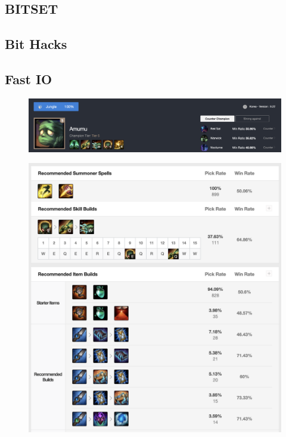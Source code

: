 \documentclass[10pt,landscape,a4paper,twocolumn]{article}
\begin{document}
\subsection{BITSET}


\subsection{Bit Hacks}


\subsection{Fast IO}


\begin{figure}[ht]
\includegraphics[scale=0.3]{1}
\end{figure}
\begin{figure}[ht]
\includegraphics[scale=0.3]{2}
\end{figure}
\end{document}
